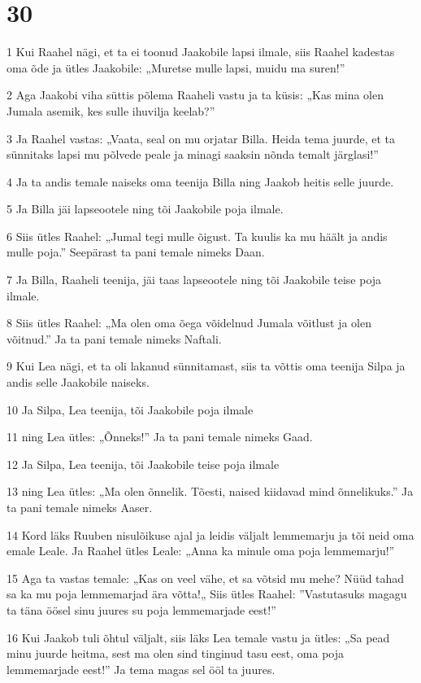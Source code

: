 \chapter{30}

\par 1 Kui Raahel nägi, et ta ei toonud Jaakobile lapsi ilmale, siis Raahel kadestas oma õde ja ütles Jaakobile: „Muretse mulle lapsi, muidu ma suren!”
\par 2 Aga Jaakobi viha süttis põlema Raaheli vastu ja ta küsis: „Kas mina olen Jumala asemik, kes sulle ihuvilja keelab?”
\par 3 Ja Raahel vastas: „Vaata, seal on mu orjatar Billa. Heida tema juurde, et ta sünnitaks lapsi mu põlvede peale ja minagi saaksin nõnda temalt järglasi!”
\par 4 Ja ta andis temale naiseks oma teenija Billa ning Jaakob heitis selle juurde.
\par 5 Ja Billa jäi lapseootele ning tõi Jaakobile poja ilmale.
\par 6 Siis ütles Raahel: „Jumal tegi mulle õigust. Ta kuulis ka mu häält ja andis mulle poja.” Seepärast ta pani temale nimeks Daan.
\par 7 Ja Billa, Raaheli teenija, jäi taas lapseootele ning tõi Jaakobile teise poja ilmale.
\par 8 Siis ütles Raahel: „Ma olen oma õega võidelnud Jumala võitlust ja olen võitnud.” Ja ta pani temale nimeks Naftali.
\par 9 Kui Lea nägi, et ta oli lakanud sünnitamast, siis ta võttis oma teenija Silpa ja andis selle Jaakobile naiseks.
\par 10 Ja Silpa, Lea teenija, tõi Jaakobile poja ilmale
\par 11 ning Lea ütles: „Õnneks!” Ja ta pani temale nimeks Gaad.
\par 12 Ja Silpa, Lea teenija, tõi Jaakobile teise poja ilmale
\par 13 ning Lea ütles: „Ma olen õnnelik. Tõesti, naised kiidavad mind õnnelikuks.” Ja ta pani temale nimeks Aaser.
\par 14 Kord läks Ruuben nisulõikuse ajal ja leidis väljalt lemmemarju ja tõi neid oma emale Leale. Ja Raahel ütles Leale: „Anna ka minule oma poja lemmemarju!”
\par 15 Aga ta vastas temale: „Kas on veel vähe, et sa võtsid mu mehe? Nüüd tahad sa ka mu poja lemmemarjad ära võtta!„ Siis ütles Raahel: ”Vastutasuks magagu ta täna öösel sinu juures su poja lemmemarjade eest!”
\par 16 Kui Jaakob tuli õhtul väljalt, siis läks Lea temale vastu ja ütles: „Sa pead minu juurde heitma, sest ma olen sind tinginud tasu eest, oma poja lemmemarjade eest!” Ja tema magas sel ööl ta juures.
